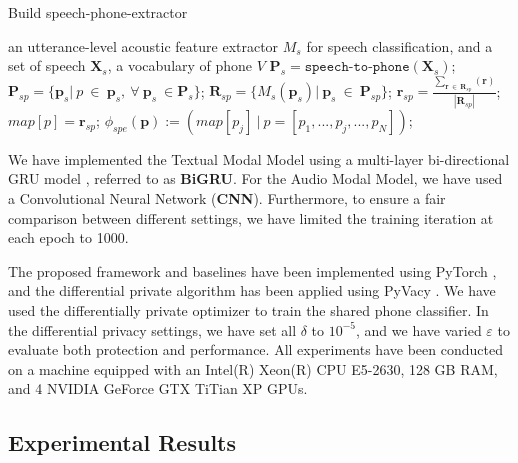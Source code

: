 \documentclass[11pt]{article}
\begin{document}
\begin{algorithm}[!htp]
\begin{algorithmic}[1]
	\caption{Build speech-phone-extractor}
	\label{alg:build-spe}
		\Require an utterance-level acoustic feature extractor ${M}_s$ for speech classification, and a set of speech $\mathbf{X}_s$, a vocabulary of phone $V$
		\State $\mathbf{P}_s = \texttt{speech-to-phone}(\mathbf{X}_s)$;
		    \State  $\mathbf{P}_{sp} = \{\mathbf{p}_s|~p~\in~\mathbf{p}_s,~\forall~\mathbf{p}_s~\in  \mathbf{P}_s\}$;
		    \State $\mathbf{R}_{sp} = \{M_s(\mathbf{p}_s)|~\mathbf{p}_s~\in~\mathbf{P}_{sp}\}$;
		    \State  $\mathbf{r}_{sp} = \frac{\sum_{\mathbf{r}~\in~\mathbf{R}_{sp}}(\mathbf{r})}{|\mathbf{R}_{sp}|}$;
		    \State  $map[p]=\mathbf{r}_{sp}$;
		\EndFor
		\State $\phi_{spe}(\mathbf{p}):=\left(map[p_j]~|~p=[p_1,...,p_j,...,p_N]\right)$;
\end{algorithmic}
\end{algorithm}

We have implemented the Textual Modal Model using a multi-layer bi-directional GRU model \cite{Xueyang-chung2014empirical}, referred to as \textbf{BiGRU}. For the Audio Modal Model, we have used a Convolutional Neural Network \cite{Xueyang-kim2014convolutional} (\textbf{CNN}). Furthermore, to ensure a fair comparison between different settings, we have limited the training iteration at each epoch to 1000.

The proposed framework and baselines have been implemented using PyTorch \cite{Xueyang-paszke2017automatic}, and the differential private algorithm has been applied using PyVacy \cite{Xueyang-waites2019pyvacy}. We have used the differentially private optimizer \cite{Xueyang-abadi2016deep} to train the shared phone classifier. In the differential privacy settings, we have set all $\delta$ to $10^{-5}$, and we have varied $\varepsilon$ to evaluate both protection and performance. All experiments have been conducted on a machine equipped with an Intel(R) Xeon(R) CPU E5-2630, 128 GB RAM, and 4 NVIDIA GeForce GTX TiTian XP GPUs.

\subsection{Experimental Results}
\end{document}
